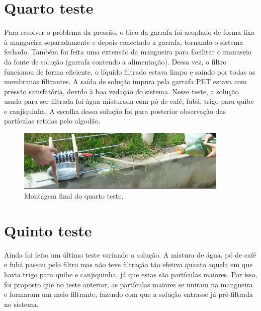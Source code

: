 \section{Quarto teste}\label{sec:quarto_teste}

Para resolver o problema da pressão, o bico da garrafa foi acoplado de forma
fixa à mangueira separadamente e depois conectado a garrafa, tornando o sistema
fechado. Também foi feita uma extensão da mangueira para facilitar o manuseio da
fonte de solução (garrafa contendo a alimentação). Dessa vez, o filtro funcionou
de forma eficiente, o líquido filtrado estava limpo e saindo por todas as
membranas filtrantes. A saída de solução impura pela garrafa PET estava com
pressão satisfatória, devido à boa vedação do sistema. Nesse teste, a solução
usada para ser filtrada foi água misturada com pó de café, fubá, trigo para
quibe e canjiquinha. A escolha dessa solução foi para posterior observação das
partículas retidas pelo algodão.

\begin{figure}[H]
  \centering
  \includegraphics[width=0.9\textwidth]{figuras/quarto_teste.png}
  \caption{Montagem final do quarto teste.\label{fig:quarto_teste}}
\end{figure}


\section{Quinto teste}\label{sec:quinto_teste}

Ainda foi feito um último teste variando a solução. A mistura de água, pó
de café e fubá passou pelo filtro mas não teve filtração tão efetiva quanto
aquela em que havia trigo para quibe e canjiquinha, já que estas são partículas
maiores. Por isso, foi proposto que no teste anterior, as partículas maiores se
uniram na mangueira e formaram um meio filtrante, fazendo com que a solução
entrasse já pré-filtrada no sistema.


